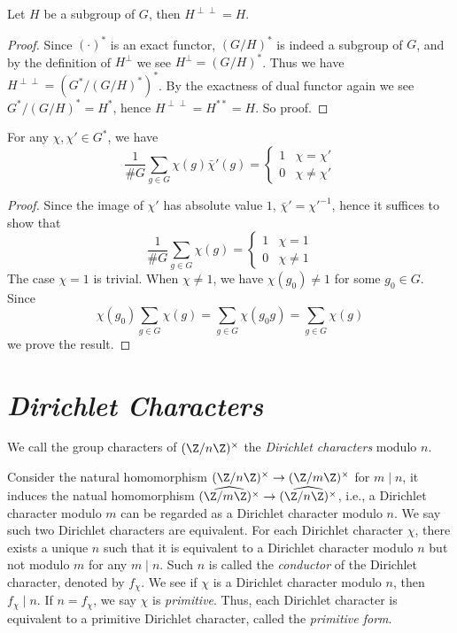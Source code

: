 \begin{proposition}
    Let $H$ be a subgroup of $G$, then $H^{\perp\perp}=H$.
\end{proposition}

\begin{proof}
    Since $(\cdot)^*$ is an exact functor, $(G/H)^*$ is indeed a subgroup of $G$, and by the definition of $H^\perp$ we see $H^\perp=(G/H)^*$. Thus we have $H^{\perp\perp}=(G^*/(G/H)^*)^*$. By the exactness of dual functor again we see $G^*/(G/H)^*=H^*$, hence $H^{\perp\perp}=H^{**}=H$. So proof.
\end{proof}

\begin{proposition}
    For any $\chi,\chi'\in G^*$, we have $$ \frac1{\#G}\sum_{g\in G}{\chi(g)\bar\chi'(g)}=\begin{cases} 1 & \chi=\chi' \\ 0 & \chi\ne\chi' \end{cases} $$
\end{proposition}

\begin{proof}
    Since the image of $\chi'$ has absolute value $1$, $\bar\chi'=\chi'^{-1}$, hence it suffices to show that $$ \frac1{\#G}\sum_{g\in G}{\chi(g)}=\begin{cases} 1 & \chi=1 \\ 0 & \chi\ne1 \end{cases} $$ The case $\chi=1$ is trivial. When $\chi\ne1$, we have $\chi(g_0)\ne1$ for some $g_0\in G$. Since $$ \chi(g_0)\sum_{g\in G}{\chi(g)}=\sum_{g\in G}{\chi(g_0g)}=\sum_{g\in G}{\chi(g)} $$ we prove the result.
\end{proof}


\section{\emph{Dirichlet Characters}}

\begin{definition}
    We call the group characters of $(\Z/n\Z)^\times$ the \emph{Dirichlet characters} modulo $n$.
\end{definition}

\begin{remark}
    Consider the natural homomorphism $(\Z/n\Z)^\times\rightarrow(\Z/m\Z)^\times$ for $m\mid n$, it induces the natual homomorphism $\widehat{(\Z/m\Z)^\times}\rightarrow\widehat{(\Z/n\Z)^\times}$, i.e., a Dirichlet character modulo $m$ can be regarded as a Dirichlet character modulo $n$. We say such two Dirichlet characters are equivalent. For each Dirichlet character $\chi$, there exists a unique $n$ such that it is equivalent to a Dirichlet character modulo $n$ but not modulo $m$ for any $m\mid n$. Such $n$ is called the \emph{conductor} of the Dirichlet character, denoted by $f_\chi$. We see if $\chi$ is a Dirichlet character modulo $n$, then $f_\chi\mid n$. If $n=f_\chi$, we say $\chi$ is \emph{primitive}. Thus, each Dirichlet character is equivalent to a primitive Dirichlet character, called the \emph{primitive form}.
\end{remark}

